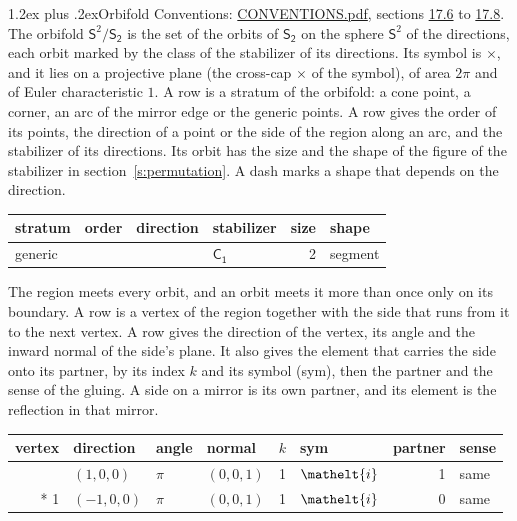 \documentclass[10pt,a4paper]{article}
\makeatletter
\renewcommand\section{\@startsection{section}{1}{\z@}{-3ex plus -1ex minus -.2ex}%
  {1.2ex plus .2ex}{\normalfont\large\sffamily\bfseries\color{parttitle}}}
\numberwithin{equation}{section}
\newcommand{\eltfont}[1]{{\let\sigma\eltsigma\mathelt{#1}}}
\newcommand{\grp}[1]{\mathsf{#1}}
\newcommand{\cls}[1]{\eltfont{#1}}
\newcommand{\orbname}[1]{#1}
\newcommand{\dirvec}[3]{(#1, #2, #3)}
\newcommand{\twosphere}{\mathsf{S}^{2}}
\makeatother
\begin{document}
\section{Orbifold}\label{s:orbifold}
Conventions: \href{../../CONVENTIONS.pdf}{CONVENTIONS.pdf}, sections \href{../../CONVENTIONS.pdf\#conv.17.6}{17.6} to \href{../../CONVENTIONS.pdf\#conv.17.8}{17.8}.
The orbifold $\twosphere/\grp{S_{2}}$ is the set of the orbits of $\grp{S_{2}}$ on the sphere $\twosphere$ of the directions, each orbit marked by the class of the stabilizer of its directions. Its symbol is $\orbname{{\times}}$, and it lies on a projective plane (the cross-cap ${\times}$ of the symbol), of area $2\pi$ and of Euler characteristic $1$.
\leavevmode\label{n:head.stratum}\label{n:head.order.point}\label{n:head.direction}\label{n:head.stabilizer}\label{n:head.size.orbit}\label{n:head.shape}A row is a stratum of the orbifold: a cone point, a corner, an arc of the mirror edge or the generic points. A row gives the order of its points, the direction of a point or the side of the region along an arc, and the stabilizer of its directions. Its orbit has the size and the shape of the figure of the stabilizer in section~\ref{s:permutation}. A dash marks a shape that depends on the direction.
{\small\setlength{\tabcolsep}{4pt}\begin{longtable}{@{}lrllrl@{}}\toprule
stratum & order & direction & stabilizer & size & shape\\\midrule\endhead
\bottomrule\endfoot\endlastfoot
generic &  &  & \href{C1.pdf}{$\grp{C_{1}}$} & 2 & segment\\
\bottomrule\end{longtable}}
\leavevmode\label{n:head.vertex.region}\label{n:head.angle}\label{n:head.normal.side}\label{n:head.partner}\label{n:head.sense}The region meets every orbit, and an orbit meets it more than once only on its boundary. A row is a vertex of the region together with the side that runs from it to the next vertex. A row gives the direction of the vertex, its angle and the inward normal of the side's plane. It also gives the element that carries the side onto its partner, by its index $k$ and its symbol (sym), then the partner and the sense of the gluing. A side on a mirror is its own partner, and its element is the reflection in that mirror.
{\small\setlength{\tabcolsep}{4pt}\begin{longtable}{@{}rlllrlrl@{}}\toprule
vertex & direction & angle & normal & $k$ & sym & partner & sense\\\midrule\endhead
\bottomrule\endfoot\endlastfoot
0 & $\dirvec{1}{0}{0}$ & $\pi$ & $\dirvec{0}{0}{1}$ & 1 & $\cls{i}$ & 1 & same\\*
1 & $\dirvec{-1}{0}{0}$ & $\pi$ & $\dirvec{0}{0}{1}$ & 1 & $\cls{i}$ & 0 & same\\
\bottomrule\end{longtable}}
\end{document}
